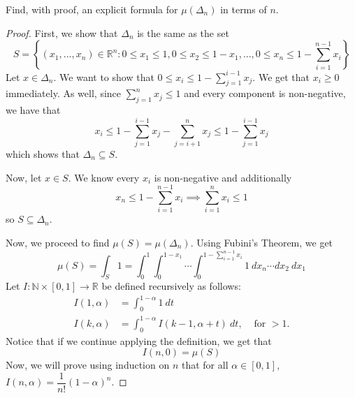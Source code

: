 \documentclass{article}
\theoremstyle{plain} %
\numberwithin{thm}{section} %
\theoremstyle{definition}
\begin{document}
        Find, with proof, an explicit formula for $\mu(\Delta_n)$ in terms of $n$.
        \begin{proof}
            First, we show that \(\Delta _n\) is the same as the set
            \[
                S = \left\{ (x_1, ..., x_n) \in \mathbb{R}^n : 0\leq x_1 \leq 1, 0 \leq x_2 \leq 1 - x_1, ..., 0 \leq x_n \leq 1 - \sum_{i=1}^{n-1} x_i \right\}
            \]
            Let \(x \in \Delta _n\). We want to show that \(0 \leq x_i \leq 1 - \sum_{j=1}^{i - 1} x_j\). We get that \(x_i \geq 0\) immediately. As well, since \(\sum_{j=1}^{n} x_j \leq 1\) and every component is non-negative, we have that
            \[
                x_i \leq 1 - \sum_{j=1}^{i - 1} x_j - \sum_{j=i+1}^{n} x_j \leq 1 - \sum_{j=1}^{i - 1} x_j
            \]
            which shows that \(\Delta _n \subseteq S\).
    
            Now, let \(x \in S\). We know every \(x_i\) is non-negative and additionally
            \[
                x_n \leq 1 - \sum_{i=1}^{n-1} x_i \implies \sum_{i=1}^{n} x_i \leq 1
            \]
            so \(S \subseteq \Delta _n\).
    
            Now, we proceed to find \(\mu (S) = \mu (\Delta _n)\). Using Fubini's Theorem, we get
            \[
                \mu (S) = \int _S 1 = \int _0^1 \int _0^{1-x_1} \cdots \int _0^{1 - \sum_{i=1}^{n-1} x_i} 1\ dx_n \cdots dx_2\ dx_1
            \]
            Let \(I: \mathbb{N} \times [0,1] \to \mathbb{R}\) be defined recursively as follows:
            \begin{align*}
                I(1, \alpha) &= \int _0^{1-\alpha} 1\ dt &\ \\
                I(k, \alpha) &= \int _0^{1-\alpha} I(k-1, \alpha + t)\ dt, &\text{ for } > 1.
            \end{align*}
            Notice that if we continue applying the definition, we get that
            \[
                I(n, 0) = \mu (S)
            \]
            Now, we will prove using induction on \(n\) that for all \(\alpha \in [0,1]\), \(I(n, \alpha) = \dfrac{1}{n!}(1 - \alpha)^n\).
    

\end{proof}
\end{document}
